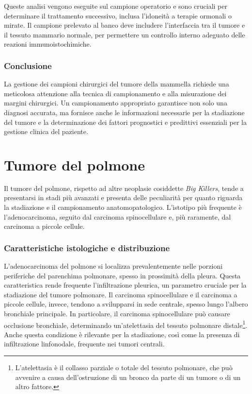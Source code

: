 Queste analisi vengono eseguite sul campione operatorio e sono cruciali per determinare il trattamento successivo, inclusa l’idoneità a terapie ormonali o mirate. Il campione prelevato al banco deve includere l'interfaccia tra il tumore e il tessuto mammario normale, per permettere un controllo interno adeguato delle reazioni immunoistochimiche.

\subsubsection{Conclusione}
La gestione dei campioni chirurgici del tumore della mammella richiede una meticolosa attenzione alla tecnica di campionamento e alla misurazione dei margini chirurgici. Un campionamento appropriato garantisce non solo una diagnosi accurata, ma fornisce anche le informazioni necessarie per la stadiazione del tumore e la determinazione dei fattori prognostici e predittivi essenziali per la gestione clinica del paziente.

\section{Tumore del polmone}
Il tumore del polmone, rispetto ad altre neoplasie cosiddette \textit{Big Killers}, tende a presentarsi in stadi più avanzati e presenta delle peculiarità per quanto riguarda la stadiazione e il campionamento anatomopatologico. L'istotipo più frequente è l'adenocarcinoma, seguito dal carcinoma spinocellulare e, più raramente, dal carcinoma a piccole cellule.

\subsubsection{Caratteristiche istologiche e distribuzione}
L'adenocarcinoma del polmone si localizza prevalentemente nelle porzioni periferiche del parenchima polmonare, spesso in prossimità della pleura. Questa caratteristica rende frequente l'infiltrazione pleurica, un parametro cruciale per la stadiazione del tumore polmonare. Il carcinoma spinocellulare e il carcinoma a piccole cellule, invece, tendono a svilupparsi in sede centrale, spesso lungo l'albero bronchiale principale. In particolare, il carcinoma spinocellulare può causare occlusione bronchiale, determinando un'atelettasia del tessuto polmonare distale\footnote{L'atelettasia è il collasso parziale o totale del tessuto polmonare, che può avvenire a causa dell'ostruzione di un bronco da parte di un tumore o di un altro fattore.}. Anche questa condizione è rilevante per la stadiazione, così come la presenza di infiltrazione linfonodale, frequente nei tumori centrali.

